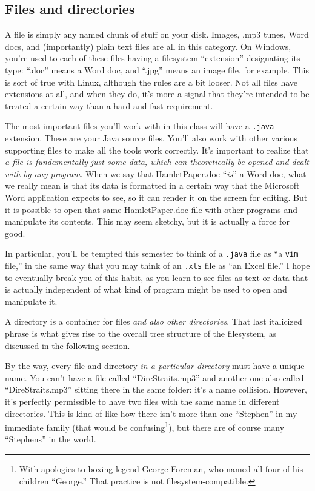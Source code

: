 \subsection{Files and directories}

A file is simply any named chunk of stuff on your disk. Images, .mp3 tunes,
Word docs, and (importantly) plain text files are all in this category. On
Windows, you're used to each of these files having a filesystem ``extension''
designating its type: ``.doc'' means a Word doc, and ``.jpg'' means an image
file, for example. This is sort of true with Linux, although the rules are
a bit looser. Not all files have extensions at all, and when they do, it's
more a signal that they're intended to be treated a certain way than a
hard-and-fast requirement.

The most important files you'll work with in this class will have a
\texttt{.java} extension. These are your Java source files. You'll also work
with other various supporting files to make all the tools work correctly.
It's important to realize that \textit{a file is fundamentally just some data,
which can theoretically be opened and dealt with by any program}. When we say
that HamletPaper.doc ``\textit{is}'' a Word doc, what we really mean is that
its data is formatted in a certain way that the Microsoft Word application
expects to see, so it can render it on the screen for editing. But it is
possible to open that same HamletPaper.doc file with other programs and
manipulate its contents. This may seem sketchy, but it is actually a force for
good.

In particular, you'll be tempted this semester to think of a \texttt{.java}
file as ``a \texttt{vim} file,'' in the same way that you may think of an
\texttt{.xls} file as ``an Excel file.'' I hope to eventually break you of this
habit, as you learn to see files as text or data that is actually independent
of what kind of program might be used to open and manipulate it.

A directory is a container for files \textit{and also other directories}. That
last italicized phrase is what gives rise to the overall tree structure of the
filesystem, as discussed in the following section.

By the way, every file and directory \textit{in a particular directory} must
have a unique name. You can't have a file called ``DireStraits.mp3'' and
another one also called ``DireStraits.mp3'' sitting there in the same folder:
it's a name collision. However, it's perfectly permissible to have two files
with the same name in different directories. This is kind of like how there
isn't more than one ``Stephen'' in my immediate family (that would be
confusing\footnote{With apologies to boxing legend George Foreman, who named
all four of his children ``George.'' That practice is not
filesystem-compatible.}), but there are of course many ``Stephens'' in the
world.

